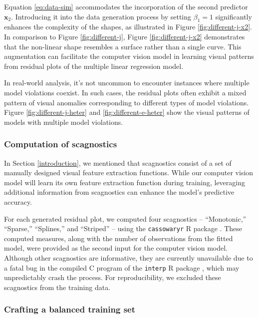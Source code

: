 \documentclass[]{interact}
\theoremstyle{plain}%
\theoremstyle{definition}
\theoremstyle{remark}
\begin{document}
Equation \ref{eq:data-sim} accommodates the incorporation of the second
predictor \(\boldsymbol{x}_2\). Introducing it into the data generation
process by setting \(\beta_1 = 1\) significantly enhances the complexity
of the shapes, as illustrated in Figure \ref{fig:different-j-x2}. In
comparison to Figure \ref{fig:different-j}, Figure
\ref{fig:different-j-x2} demonstrates that the non-linear shape
resembles a surface rather than a single curve. This augmentation can
facilitate the computer vision model in learning visual patterns from
residual plots of the multiple linear regression model.

In real-world analysis, it's not uncommon to encounter instances where
multiple model violations coexist. In such cases, the residual plots
often exhibit a mixed pattern of visual anomalies corresponding to
different types of model violations. Figure \ref{fig:different-j-heter}
and \ref{fig:different-e-heter} show the visual patterns of models with
multiple model violations.

\subsubsection{Computation of
scagnostics}\label{computation-of-scagnostics}

In Section \ref{introduction}, we mentioned that scagnostics consist of
a set of manually designed visual feature extraction functions. While
our computer vision model will learn its own feature extraction function
during training, leveraging additional information from scagnostics can
enhance the model's predictive accuracy.

For each generated residual plot, we computed four scagnostics --
``Monotonic,'' ``Sparse,'' ``Splines,'' and ``Striped'' -- using the
\texttt{cassowaryr} R package \citep{mason2022cassowaryr}. These
computed measures, along with the number of observations from the fitted
model, were provided as the second input for the computer vision model.
Although other scagnostics are informative, they are currently
unavailable due to a fatal bug in the compiled C program of the
\texttt{interp} R package \citep{Albrecht2023interp}, which may
unpredictably crash the process. For reproducibility, we excluded these
scagnostics from the training data.

\subsubsection{Crafting a balanced training
set}\label{crafting-a-balanced-training-set}
\end{document}
